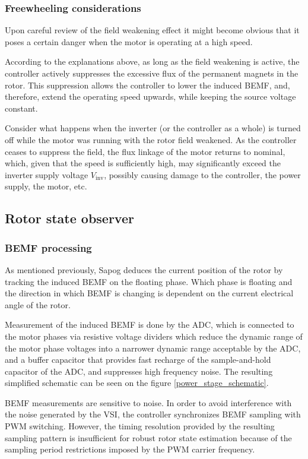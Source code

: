 \documentclass{zubaxdoc}
\begin{document}
\subsubsection{Freewheeling considerations}

Upon careful review of the field weakening effect it might become obvious that it poses a certain danger
when the motor is operating at a high speed.

According to the explanations above, as long as the field weakening is active,
the controller actively suppresses the excessive flux of the permanent magnets in the rotor.
This suppression allows the controller to lower the induced BEMF, and, therefore,
extend the operating speed upwards, while keeping the source voltage constant.

Consider what happens when the inverter (or the controller as a whole) is turned off while the
motor was running with the rotor field weakened.
As the controller ceases to suppress the field, the flux linkage of the motor returns to nominal,
which, given that the speed is sufficiently high, may significantly exceed the inverter supply
voltage $V_\text{inv}$, possibly causing damage to the controller, the power supply, the motor, etc.

\subsection{Rotor state observer}

\subsubsection{BEMF processing}

As mentioned previously, Sapog deduces the current position of the rotor by tracking the induced BEMF
on the floating phase.
Which phase is floating and the direction in which BEMF is changing is dependent on the current electrical
angle of the rotor.

Measurement of the induced BEMF is done by the ADC, which is connected to the motor phases via
resistive voltage dividers which reduce the dynamic range of the motor phase voltages into a narrower
dynamic range acceptable by the ADC,
and a buffer capacitor that provides fast recharge of the sample-and-hold capacitor of the ADC,
and suppresses high frequency noise.
The resulting simplified schematic can be seen on the figure \ref{power_stage_schematic}.

BEMF measurements are sensitive to noise. In order to avoid interference with the noise generated
by the VSI, the controller synchronizes BEMF sampling with PWM switching.
However, the timing resolution provided by the resulting sampling pattern is insufficient for robust
rotor state estimation because of the sampling period restrictions imposed by the
PWM carrier frequency.
\end{document}
